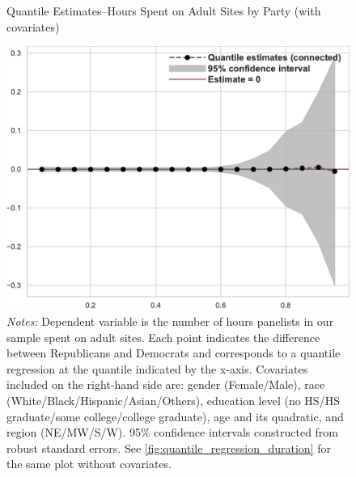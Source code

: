 \documentclass[12pt, letterpaper]{article}
\begin{document}
\begin{figure}[ht]
	\centering
	\caption{Quantile Estimates--Hours Spent on Adult Sites by Party (with covariates)}
	\includegraphics[width=.55\linewidth]{../figs/quantile_reg_covariates_duration_adult.pdf}
	\caption*{\footnotesize \emph{Notes:} 
		Dependent variable is the number of hours panelists in our sample spent on adult sites.
		Each point indicates the difference between Republicans and Democrats and corresponds to a quantile regression at the quantile indicated by the x-axis.
		Covariates included on the right-hand side are: gender (Female/Male), race (White/Black/Hispanic/Asian/Others), education level (no HS/HS graduate/some college/college graduate), age and its quadratic, and region (NE/MW/S/W).
		95\% confidence intervals constructed from robust standard errors.
		See \cref{fig:quantile_regression_duration} for the same plot without covariates.
	}
	\label{fig:quantile_regression_duration_covariates}
\end{figure}
\end{document}

